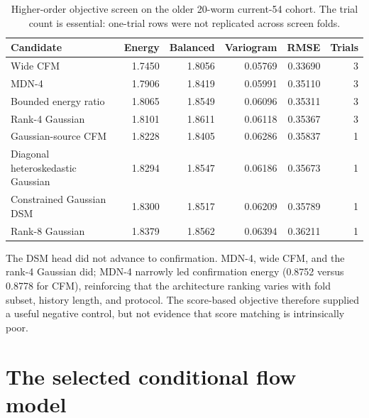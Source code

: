 \documentclass[11pt]{article}
\begin{document}
\begin{table}[ht]
\centering
\scriptsize
\caption{Higher-order objective screen on the older 20-worm current-54 cohort. The trial count is essential: one-trial rows were not replicated across screen folds.}
\label{tab:scorescreen}
\begin{tabular}{lrrrrr}
\toprule
Candidate & Energy & Balanced & Variogram & RMSE & Trials \\
\midrule
Wide CFM & 1.7450 & 1.8056 & 0.05769 & 0.33690 & 3 \\
MDN-4 & 1.7906 & 1.8419 & 0.05991 & 0.35110 & 3 \\
Bounded energy ratio & 1.8065 & 1.8549 & 0.06096 & 0.35311 & 3 \\
Rank-4 Gaussian & 1.8101 & 1.8611 & 0.06118 & 0.35367 & 3 \\
Gaussian-source CFM & 1.8228 & 1.8405 & 0.06286 & 0.35837 & 1 \\
Diagonal heteroskedastic Gaussian & 1.8294 & 1.8547 & 0.06186 & 0.35673 & 1 \\
Constrained Gaussian DSM & 1.8300 & 1.8517 & 0.06209 & 0.35789 & 1 \\
Rank-8 Gaussian & 1.8379 & 1.8562 & 0.06394 & 0.36211 & 1 \\
\bottomrule
\end{tabular}
\end{table}

The DSM head did not advance to confirmation. MDN-4, wide CFM, and the rank-4 Gaussian did; MDN-4 narrowly led confirmation energy (0.8752 versus 0.8778 for CFM), reinforcing that the architecture ranking varies with fold subset, history length, and protocol. The score-based objective therefore supplied a useful negative control, but not evidence that score matching is intrinsically poor.

\section{The selected conditional flow model}
\end{document}
